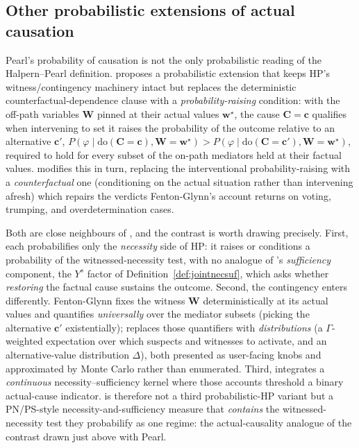\subsection{Other probabilistic extensions of actual causation}
\label{sec:other-prob-ac}

Pearl's probability of causation is not the only probabilistic reading of the
Halpern--Pearl definition. \citet{Fenton-Glynn2017-FENAPP-2} proposes a probabilistic
extension that keeps HP's witness/contingency machinery intact but replaces the
deterministic counterfactual-dependence clause with a \emph{probability-raising}
condition: with the off-path variables $\mathbf{W}$ pinned at their actual values
$\mathbf{w}^\star$, the cause $\mathbf{C}=\mathbf{c}$ qualifies when intervening to set
it raises the probability of the outcome relative to an alternative $\mathbf{c}'$,
$P(\varphi \mid \mathrm{do}(\mathbf{C}=\mathbf{c}),\mathbf{W}=\mathbf{w}^\star) >
P(\varphi \mid \mathrm{do}(\mathbf{C}=\mathbf{c}'),\mathbf{W}=\mathbf{w}^\star)$,
required to hold for every subset of the on-path mediators held at their factual values.
\citet{fang2022probabilistic} modifies this in turn, replacing the interventional
probability-raising with a \emph{counterfactual} one (conditioning on the actual
situation rather than intervening afresh) which repairs the verdicts
Fenton-Glynn's account returns on voting, trumping, and overdetermination cases.

Both are close neighbours of \ourapproach, and the contrast is worth drawing precisely.
First, each
probabilifies only the \emph{necessity} side of HP: it raises or conditions a
probability of the witnessed-necessity test, with no analogue of \ourapproach's
\emph{sufficiency} component, the $Y^s$ factor of Definition~\ref{def:jointnecsuf},
which asks whether \emph{restoring} the factual cause sustains the outcome. Second, the
contingency enters differently. Fenton-Glynn fixes the witness $\mathbf{W}$
deterministically at its actual values and quantifies \emph{universally} over the
mediator subsets (picking the alternative $\mathbf{c}'$ existentially); \ourapproach
replaces those quantifiers with \emph{distributions} (a $\Gamma$-weighted expectation
over which suspects and witnesses to activate, and an alternative-value distribution
$\Delta$), both presented as user-facing knobs and approximated by Monte Carlo rather
than enumerated. Third, \ourapproach integrates a \emph{continuous} necessity--sufficiency kernel where those accounts threshold a binary actual-cause indicator.
\ourapproach is therefore not a third probabilistic-HP variant but a PN/PS-style
necessity-and-sufficiency measure that \emph{contains} the witnessed-necessity test they
probabilify as one regime: the actual-causality analogue of the contrast drawn just
above with Pearl.

